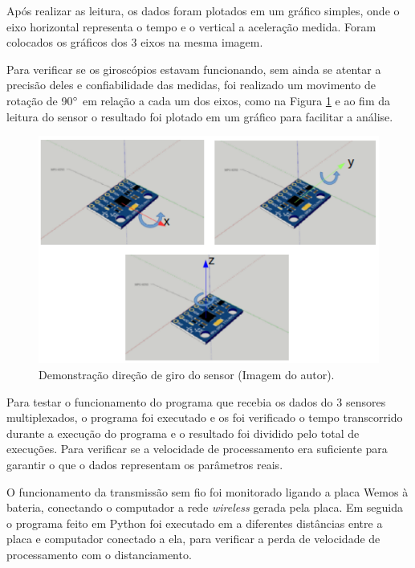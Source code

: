 	Após realizar as leitura, os dados foram plotados em um gráfico simples, onde o eixo horizontal representa o tempo e o vertical a aceleração medida. Foram colocados os gráficos dos 3 eixos na mesma imagem. 
	
	Para verificar se os giroscópios estavam funcionando, sem ainda se atentar a precisão deles e confiabilidade das medidas, foi realizado um movimento de rotação de 90$ \degree $ em relação a cada um dos eixos, como na Figura \ref{validacao_giro}  e ao fim da leitura do sensor o resultado foi plotado em um gráfico para facilitar a análise.
	
	\begin{figure}[h!]
		\centering
		\includegraphics[keepaspectratio=true,scale=0.55]{figuras/validacao_giro.png}
		\caption{Demonstração direção de giro do sensor (Imagem do autor).}
	
		\label{validacao_giro}	
	\end{figure}
	
	Para testar o funcionamento do programa que recebia os dados do 3 sensores multiplexados, o programa foi executado e os foi verificado o tempo transcorrido durante a execução do programa e o resultado foi dividido pelo total de execuções. Para verificar se a velocidade de processamento era suficiente para garantir o que o dados representam os parâmetros reais.
	
	O funcionamento da transmissão sem fio foi monitorado ligando a placa Wemos à bateria, conectando o computador a rede \textit{wireless} gerada pela placa. Em seguida o programa feito em Python foi executado em a diferentes distâncias entre a placa e computador conectado a ela, para verificar a perda de velocidade de processamento com o distanciamento.
	
